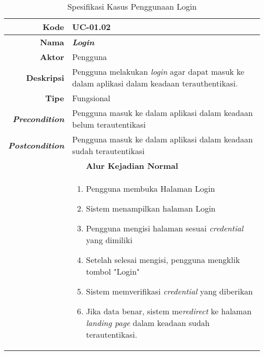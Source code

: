\begin{table}[H]
	\centering
	\caption{Spesifikasi Kasus Penggunaan Login }
	\label{uc01.02}
	\begin{tabular}{|r|p{8cm}|}
		\hline
		\textbf{Kode}                                                    & UC-01.02                                                     \\ \hline
		\textbf{Nama}                                                    & \textbf{\textit{Login}}                                         \\ \hline
		\textbf{Aktor}                                                   & Pengguna                                                    \\ \hline
		\textbf{Deskripsi}                                               & Pengguna melakukan \textit{login} agar dapat masuk ke dalam aplikasi dalam keadaan terauthentikasi. \\ \hline
		\textbf{Tipe}                                                    & Fungsional                                                  \\ \hline
		\textbf{\textit{Precondition}}
		& Pengguna masuk ke dalam aplikasi dalam keadaan belum terautentikasi                    \\ \hline
		\textbf{\textit{Postcondition}} 
		& Pengguna masuk ke dalam aplikasi dalam keadaan sudah terautentikasi          \\ \hline
		\multicolumn{2}{|c|}{\textbf{Alur Kejadian Normal}}                                                                            \\ \hline
		\multicolumn{1}{|l|}{}                                           & 
		\begin{enumerate}
			\item Pengguna membuka Halaman Login
			\item \label{uc0102-show1page}Sistem menampilkan halaman Login
			\item Pengguna mengisi halaman sesuai \textit{credential} yang dimiliki
			\item Setelah selesai mengisi, pengguna mengklik tombol "Login"
			\item \label{al-0102-a} Sistem memverifikasi \textit{credential} yang diberikan
			\item Jika data benar, sistem me\textit{redirect} ke halaman \textit{landing page} dalam keadaan sudah terautentikasi.
		\end{enumerate}
		\\ \hline

\end{tabular}
\end{table}
